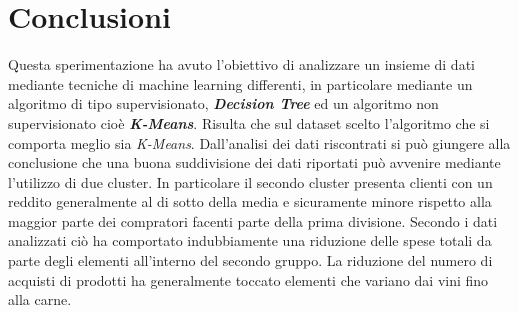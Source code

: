 \documentclass[letterpaper,11pt]{article}
\newcommand\blankpage{%
    \null
    \thispagestyle{empty}%
    \addtocounter{page}{-1}%
    \newpage}
\begin{document}
\blankpage


\section*{Conclusioni}

Questa sperimentazione ha avuto l'obiettivo di analizzare un insieme di dati mediante tecniche di machine learning differenti, in particolare mediante un algoritmo di tipo supervisionato, \textit{\textbf{Decision Tree}} ed un algoritmo non supervisionato cioè  \textit{\textbf{K-Means}}. Risulta che sul dataset scelto l'algoritmo che si comporta meglio sia \textit{K-Means}. Dall'analisi dei dati riscontrati si può giungere alla conclusione che una buona suddivisione dei dati riportati può avvenire mediante l'utilizzo di due cluster. In particolare il secondo cluster presenta clienti con un reddito generalmente al di sotto della media e sicuramente minore rispetto alla maggior parte dei compratori facenti parte della prima divisione. Secondo i dati analizzati ciò ha comportato indubbiamente una riduzione delle spese totali da parte degli elementi all'interno del secondo gruppo. La riduzione del numero di acquisti di prodotti ha generalmente toccato elementi che variano dai vini fino alla carne. 
\end{document}
